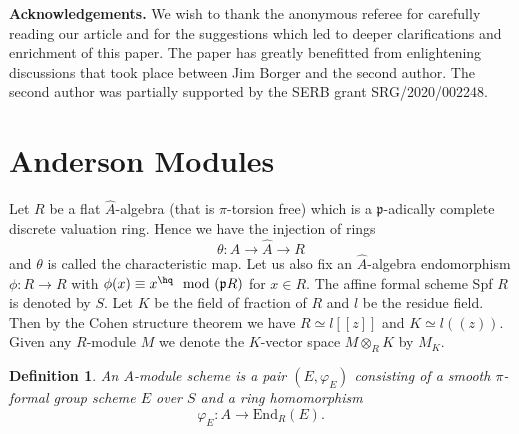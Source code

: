 \documentclass{amsart}
\newtheorem {definition}[theorem]{\bf Definition}
\numberwithin {equation}{section}
\begin{document}
{\bf Acknowledgements.} 
We wish to thank the anonymous referee for carefully reading our article and for
the suggestions which led to deeper clarifications and enrichment of this paper.
The paper has greatly benefitted from enlightening discussions that took 
place between Jim Borger and the second author.
The second author was partially supported by the SERB grant 
SRG/2020/002248.


\section{Anderson Modules }
\label{AndMod}


Let $R$ be a flat $\hat{A}$-algebra (that is $\pi$-torsion free) which is a 
$\mathfrak{p}$-adically complete discrete valuation ring. Hence we have the injection of rings
 $$ \theta :A\longrightarrow \hat{A} \longrightarrow R$$ 
and $\theta$ is called the characteristic map.
Let us also fix an $\hat{A}$-algebra endomorphism $\phi:R\longrightarrow R$ with $\phi(x)\equiv x^{\hq}\mod(\mathfrak{p}R)$ for $x\in R$. The affine formal scheme Spf $R$ is denoted by $S$. Let $K$ be the field of fraction of $R$ and $l$ be the residue field. Then by the Cohen structure theorem we have $R\simeq l[[z]]$ and $K\simeq l((z))$. 
Given any $R$-module $M$ we denote  the $K$-vector space $M\otimes _{R}K$  by 
$M_{K}$.

\begin{definition} An \emph{$A$-module scheme}  is a pair $(E,\varphi_{E})$ consisting of a smooth $\pi$-formal group scheme $E$ over $S$ and a ring homomorphism $$\varphi_{E}:A\longrightarrow \mathrm{End}_{R}(E).$$ 
\end{definition}
\end{document}
